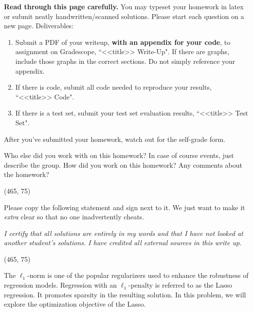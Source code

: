 \documentclass[preview]{standalone}
\begin{document}
\fontsize{12}{15}\selectfont


\textbf{Read through this page carefully.} You may typeset your homework in latex or submit neatly handwritten/scanned solutions. Please start each question on a new page. Deliverables:

\begin{enumerate}
  \item Submit a PDF of your writeup, \textbf{with an appendix for your code}, to assignment on Gradescope, ``<<title>> Write-Up". If there are graphs, include those graphs in the correct sections. Do not simply reference your appendix.
  \item If there is code, submit all code needed to reproduce your results, ``<<title>> Code".
  \item If there is a test set, submit your test set evaluation results, ``<<title>> Test Set".
\end{enumerate}

After you've submitted your homework, watch out for the self-grade form.

\begin{Parts}

\Part Who else did you work with on this homework? In case of course events, just describe the group. How did you work on this homework? Any comments about the homework?

\vspace{15pt}
\framebox(465, 75){}

\Part Please copy the following statement and sign next to it. We just want to make it \textit{extra} clear so that no one inadvertently cheats.

\textit{I certify that all solutions are entirely in my words and that I have not looked at another student's solutions. I have credited all external sources in this write up.}

\vspace{15pt}
\framebox(465, 75){}

\end{Parts}

\pagebreak


The $\ell_1$-norm is one of the popular regularizers used to enhance the robustness of regression models.
Regression with an $\ell_1$-penalty is referred to as the Lasso regression.
It promotes sparsity in the resulting solution.
In this problem, we will explore the optimization objective of the Lasso.
\end{document}
